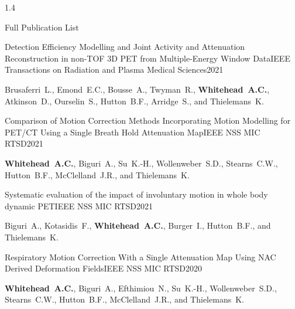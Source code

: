 \documentclass{cv}
\begin{document}
\begin{spacing}{1.4}
\begin{rSection}{Full Publication List}
            \vspace{-0.5cm}
            \item \begin{rSubsection}{Detection Efficiency Modelling and Joint Activity and Attenuation Reconstruction in non-TOF 3D PET from Multiple-Energy Window Data}{}{IEEE Transactions on Radiation and Plasma Medical Sciences}{2021}
                \vspace{-0.25cm}
                \item Brusaferri~L., Emond~E.C., Bousse~A., Twyman~R., \textbf{Whitehead~A.C.}, Atkinson~D., Ourselin~S., Hutton~B.F., Arridge~S., and Thielemans~K.
            \end{rSubsection}
    
            \vspace{-0.5cm}
            \item \begin{rSubsection}{Comparison of Motion Correction Methods Incorporating Motion Modelling for PET/CT Using a Single Breath Hold Attenuation Map}{}{IEEE NSS MIC RTSD}{2021}
                \vspace{-0.25cm}
                \item \textbf{Whitehead~A.C.}, Biguri~A., Su~K.-H., Wollenweber~S.D., Stearns~C.W., Hutton~B.F., McClelland~J.R., and Thielemans~K.
            \end{rSubsection}
    
            \vspace{-0.5cm}
            \item \begin{rSubsection}{Systematic evaluation of the impact of involuntary motion in whole body dynamic PET}{}{IEEE NSS MIC RTSD}{2021}
                \vspace{-0.25cm}
                \item Biguri~A., Kotasidis~F., \textbf{Whitehead~A.C.}, Burger~I., Hutton~B.F., and Thielemans~K.
            \end{rSubsection}
    
            \vspace{-0.5cm}
            \item \begin{rSubsection}{Respiratory Motion Correction With a Single Attenuation Map Using NAC Derived Deformation Fields}{}{IEEE NSS MIC RTSD}{2020}
                \vspace{-0.25cm}
                \item \textbf{Whitehead~A.C.}, Biguri~A., Efthimiou~N., Su~K.-H., Wollenweber~S.D., Stearns~C.W., Hutton~B.F., McClelland~J.R., and Thielemans~K.
            \end{rSubsection}
    

\end{rSection}
\end{spacing}
\end{document}
